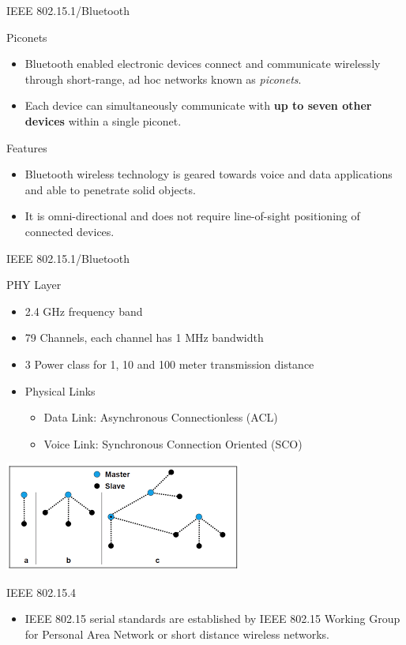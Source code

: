 \documentclass[serif,Blue]{beamer}
\begin{document}
\begin{frame}{IEEE 802.15.1/Bluetooth}
	\begin{block}{Piconets}
		\begin{itemize}\justifying{}
			\item
				Bluetooth enabled electronic devices connect and communicate
				wirelessly through short-range, ad hoc networks known as \emph{piconets}.
			\item
				Each device can simultaneously communicate with \textbf{up to seven other devices} within a
				single piconet.
		\end{itemize}
	\end{block}
	\begin{block}{Features}
		\begin{itemize}\justifying{}
			\item
				Bluetooth wireless technology is geared towards voice and data applications
				and able to penetrate solid objects.
			\item
				It is omni-directional and does not require line-of-sight positioning of connected devices.
		\end{itemize}
	\end{block}
\end{frame}

\begin{frame}{IEEE 802.15.1/Bluetooth}
	\begin{block}{PHY Layer}
		\begin{itemize}\justifying{}
			\item 2.4 GHz frequency band
			\item 79 Channels, each channel has 1 MHz bandwidth
			\item 3 Power class for 1, 10 and 100 meter transmission distance
			\item Physical Links
			\begin{itemize}
				\item Data Link: Asynchronous Connectionless (ACL)
				\item Voice Link: Synchronous Connection Oriented (SCO)
			\end{itemize}
		\end{itemize}
	\end{block}
	\center\includegraphics[scale=.7]{img/btopo.png}
\end{frame}

\begin{frame}{IEEE 802.15.4}
	\begin{itemize}\justifying{}
		\item
			IEEE 802.15 serial standards are established by IEEE 802.15 Working Group
			for Personal Area Network or short distance wireless networks.
	\end{itemize}
\end{frame}
\end{document}
